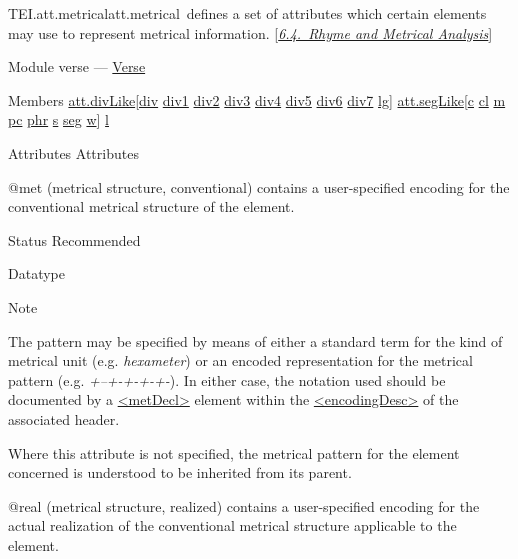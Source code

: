 \begin{reflist}
\item[]\begin{specHead}{TEI.att.metrical}{att.metrical} defines a set of attributes which certain elements may use to represent metrical information. [\textit{\hyperref[VEME]{6.4.\ Rhyme and Metrical Analysis}}]\end{specHead} 
    \item[{Module}]
  verse — \hyperref[VE]{Verse}
    \item[{Members}]
  \hyperref[TEI.att.divLike]{att.divLike}[\hyperref[TEI.div]{div} \hyperref[TEI.div1]{div1} \hyperref[TEI.div2]{div2} \hyperref[TEI.div3]{div3} \hyperref[TEI.div4]{div4} \hyperref[TEI.div5]{div5} \hyperref[TEI.div6]{div6} \hyperref[TEI.div7]{div7} \hyperref[TEI.lg]{lg}] \hyperref[TEI.att.segLike]{att.segLike}[\hyperref[TEI.c]{c} \hyperref[TEI.cl]{cl} \hyperref[TEI.m]{m} \hyperref[TEI.pc]{pc} \hyperref[TEI.phr]{phr} \hyperref[TEI.s]{s} \hyperref[TEI.seg]{seg} \hyperref[TEI.w]{w}] \hyperref[TEI.l]{l}
    \item[{Attributes}]
  Attributes\hfil\\[-10pt]\begin{sansreflist}
    \item[@met]
  (metrical structure, conventional) contains a user-specified encoding for the conventional metrical structure of the element.
\begin{reflist}
    \item[{Status}]
  Recommended
    \item[{Datatype}]
    \item[{Note}]
  \par
The pattern may be specified by means of either a standard term for the kind of metrical unit (e.g. \textit{hexameter}) or an encoded representation for the metrical pattern (e.g. \textit{+--+-+-+-+-}). In either case, the notation used should be documented by a \hyperref[TEI.metDecl]{<metDecl>} element within the \hyperref[TEI.encodingDesc]{<encodingDesc>} of the associated header.\par
Where this attribute is not specified, the metrical pattern for the element concerned is understood to be inherited from its parent.
\end{reflist}  
    \item[@real]
  (metrical structure, realized) contains a user-specified encoding for the actual realization of the conventional metrical structure applicable to the element.

\end{sansreflist}
\end{reflist}
